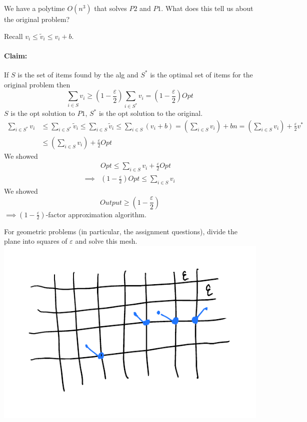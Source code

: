 \documentclass[12 pt]{article}
\begin{document}
          We have a polytime $O(n^3)$ that solves $P2$ and $P1$. What
          does this tell us about the original problem?

          Recall $v_i \leq \tilde{v}_i \leq v_i + b$.
          \paragraph{Claim:} If $S$ is the set of items found by the
          alg and $S^*$ is the optimal set of items for the original
          problem then
          $$\sum_{i \in S}v_i \geq \left(1-\frac{\varepsilon}{2}\right)\sum_{i\in S^*}v_i = \left(1-\frac{\varepsilon}{2}\right)Opt$$
          $S$ is the opt solution to $P1$, $S^*$ is the opt solution
          to the original.
          \begin{align*}
            \sum_{i\in S^*} v_i & \leq \sum_{i \in S^*}\tilde{v}_i \leq \sum_{i\in S}\tilde{v}_i \leq \sum_{i \in S}(v_i + b) = \left(\sum_{i \in S}v_i\right)+bn
                                  = \left(\sum_{i\in S}v_i\right)+\frac{\varepsilon}{2}v^*
            \\ & \leq \left(\sum_{i\in S}v_i\right)+\frac{\varepsilon}{2}Opt
          \end{align*}
          We showed
          \begin{align*}
            & Opt \leq \sum_{i\in S}v_i + \frac{\varepsilon}{2}Opt
            \\  \implies & \left(1-\frac{\varepsilon}{2}\right)Opt\leq \sum_{i\in S}v_i
          \end{align*}
          We showed
          $$Output \geq \left(1-\frac{\varepsilon}{2}\right)$$
          $\implies (1-\frac{\varepsilon}{2})$-factor approximation
          algorithm.

          For geometric problems (in particular, the assignment
          questions), divide the plane into squares of $\varepsilon$
          and solve this mesh.
          \\ \includegraphics[width=.9\textwidth]{i160.pdf}
\end{document}
